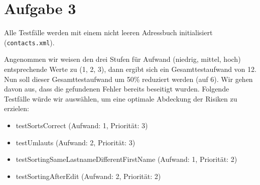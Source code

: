 \section{Aufgabe 3}
Alle Testfälle werden mit einem nicht leeren Adressbuch initialisiert (\texttt{contacts.xml}).

Angenommen wir weisen den drei Stufen für Aufwand (niedrig, mittel, hoch) entsprechende Werte zu (1, 2, 3), dann ergibt sich ein Gesamttestaufwand von 12. Nun soll dieser Gesamttestaufwand um 50\% reduziert werden (auf 6). Wir gehen davon aus, dass die gefundenen Fehler bereits beseitigt wurden. Folgende Testfälle würde wir auswählen, um eine optimale Abdeckung der Risiken zu erzielen:

\begin{itemize}
\item testSortsCorrect (Aufwand: 1, Priorität: 3)
\item testUmlauts (Aufwand: 2, Priorität: 3)
\item testSortingSameLastnameDifferentFirstName (Aufwand: 1, Priorität: 2)
\item testSortingAfterEdit (Aufwand: 2, Priorität: 2)
\end{itemize}
